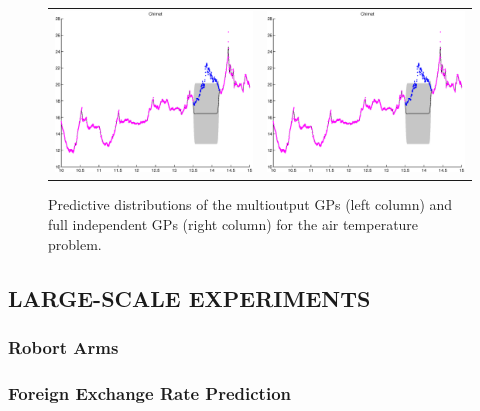 \begin{figure}
\begin{tabular}{cc}
\includegraphics[scale=0.3]{figures/weatherChimet.eps} &
\includegraphics[scale=0.3]{figures/weatherChimet.eps}
\end{tabular}
\caption{Predictive distributions of the multioutput GPs (left column) and full independent GPs (right column) for the air temperature problem.}
\label{fig:toy}
\end{figure}

\subsection{LARGE-SCALE EXPERIMENTS}
\subsubsection{Robort Arms}
\subsubsection{Foreign Exchange Rate Prediction}
